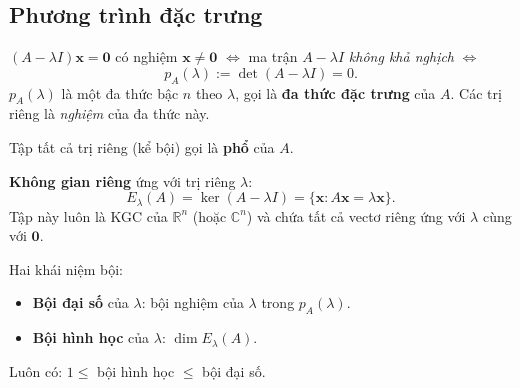 \documentclass[12pt,a4paper]{article}
\begin{document}
\begin{center}
\end{center}

\subsection{Phương trình đặc trưng}

\begin{congthuc}[title={Cách tìm trị riêng}]
$(A - \lambda I)\mathbf{x} = \mathbf{0}$ có nghiệm $\mathbf{x} \ne \mathbf{0}$ $\Leftrightarrow$ ma trận $A - \lambda I$ \emph{không khả nghịch} $\Leftrightarrow$
\[
  \boxed{p_A(\lambda) := \det(A - \lambda I) = 0.}
\]
$p_A(\lambda)$ là một đa thức bậc $n$ theo $\lambda$, gọi là \textbf{đa thức đặc trưng} của $A$. Các trị riêng là \emph{nghiệm} của đa thức này.

Tập tất cả trị riêng (kể bội) gọi là \textbf{phổ} của $A$.
\end{congthuc}

\begin{dinhnghia}[title={Không gian riêng}]
  \textbf{Không gian riêng} ứng với trị riêng $\lambda$:
  \[
    E_\lambda(A) = \ker(A - \lambda I) = \{\mathbf{x} : A\mathbf{x} = \lambda\mathbf{x}\}.
  \]
  Tập này luôn là KGC của $\mathbb{R}^n$ (hoặc $\mathbb{C}^n$) và chứa tất cả vectơ riêng ứng với $\lambda$ cùng với $\mathbf{0}$.

  Hai khái niệm bội:
  \begin{itemize}
    \item \textbf{Bội đại số} của $\lambda$: bội nghiệm của $\lambda$ trong $p_A(\lambda)$.
    \item \textbf{Bội hình học} của $\lambda$: $\dim E_\lambda(A)$.
  \end{itemize}
  Luôn có: $1 \le$ bội hình học $\le$ bội đại số.
\end{dinhnghia}
\end{document}
